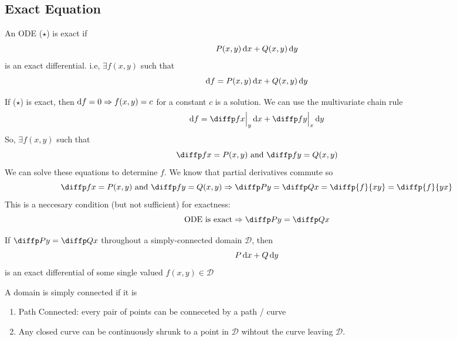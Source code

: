 \documentclass{article}
\begin{document}
\subsection{Exact Equation}
\begin{defi}
    An ODE ($\star$) is exact if
    \[
        P(x, y)  \mathop{}\!\mathrm{d} x + Q(x, y) \mathop{}\!\mathrm{d} y
    \]
    is an exact differential. i.e, $\exists f(x, y)$ such that
    \[
        \mathop{}\!\mathrm{d} f = P(x, y)  \mathop{}\!\mathrm{d} x + Q(x, y) \mathop{}\!\mathrm{d} y
    \]
\end{defi}
If ($\star$) is exact, then $\mathop{}\!\mathrm{d} f = 0 \Rightarrow f(x, y) = c$ for a constant $c$ is a solution.
We can use the multivariate chain rule
\[
    \diffd f = \diffp fx \eval_{y}{} \diffd x + \diffp fy \eval_{x}{} \diffd y
\]
So, $\exists f(x, y)$ such that
\[
    \diffp fx = P(x, y) \text{ and } \diffp fy = Q(x, y)
\]
We can solve these equations to determine $f$. 
We know that partial derivatives commute so
\[
    \diffp fx = P(x, y) \text{ and } \diffp fy = Q(x, y) \Rightarrow \diffp Py = \diffp Qx = \diffp{f}{{x}{y}} = \diffp{f}{{y}{x}}
\]
This is a neccesary condition (but not sufficient) for exactness:
\[
    \text{ODE is exact} \Rightarrow \diffp Py = \diffp Qx
\]

\begin{thm}
    If $\diffp Py = \diffp Qx$ throughout a simply-connected domain $\mathcal{D}$, then
    \[
        P \mathop{}\!\mathrm{d} x + Q \mathop{}\!\mathrm{d} y  
    \]
    is an exact differential of some single valued $f(x, y) \in \mathcal{D}$
\end{thm}

\begin{defi}
    A domain is simply connected if it is
    \begin{enumerate}
        \item Path Connected: every pair of points can be conneceted by a path / curve
        \item Any closed curve can be continuously shrunk to a point in $\mathcal{D}$ wihtout the curve leaving $\mathcal{D}$.
    \end{enumerate}
\end{defi}
\end{document}
